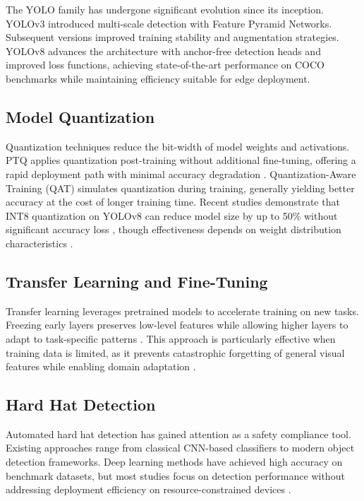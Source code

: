 \documentclass[conference,a4paper]{IEEEtran}
\begin{document}
The YOLO family has undergone significant evolution since its inception. YOLOv3 \cite{redmon2018yolov3} introduced multi-scale detection with Feature Pyramid Networks. Subsequent versions improved training stability and augmentation strategies. YOLOv8 \cite{jocher2023ultralytics} advances the architecture with anchor-free detection heads and improved loss functions, achieving state-of-the-art performance on COCO benchmarks while maintaining efficiency suitable for edge deployment.

\subsection{Model Quantization}

Quantization techniques reduce the bit-width of model weights and activations. PTQ applies quantization post-training without additional fine-tuning, offering a rapid deployment path with minimal accuracy degradation \cite{jacob2018quantization}. Quantization-Aware Training (QAT) simulates quantization during training, generally yielding better accuracy at the cost of longer training time. Recent studies demonstrate that INT8 quantization on YOLOv8 can reduce model size by up to 50\% without significant accuracy loss \cite{wicaksono2025optimizing}, though effectiveness depends on weight distribution characteristics \cite{rey2025performance}.

\subsection{Transfer Learning and Fine-Tuning}

Transfer learning leverages pretrained models to accelerate training on new tasks. Freezing early layers preserves low-level features while allowing higher layers to adapt to task-specific patterns \cite{tan2019efficientnet}. This approach is particularly effective when training data is limited, as it prevents catastrophic forgetting of general visual features while enabling domain adaptation \cite{howard2017mobilenets}.

\subsection{Hard Hat Detection}

Automated hard hat detection has gained attention as a safety compliance tool. Existing approaches range from classical CNN-based classifiers to modern object detection frameworks. Deep learning methods have achieved high accuracy on benchmark datasets, but most studies focus on detection performance without addressing deployment efficiency on resource-constrained devices \cite{zhao2021ppe, li2020automatic}.
\end{document}
